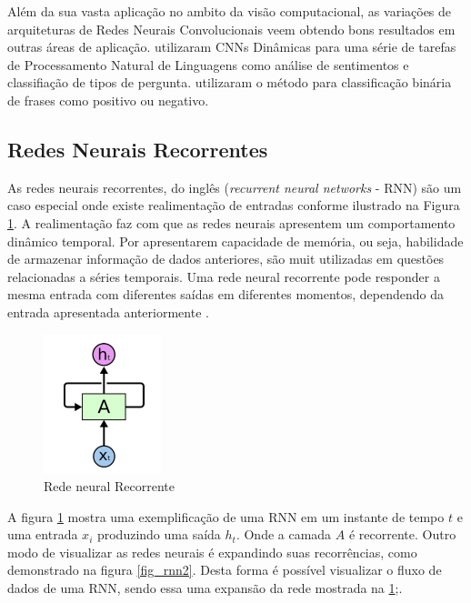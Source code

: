 Além da sua vasta aplicação no ambito da visão computacional, as variações de arquiteturas de Redes Neurais Convolucionais veem obtendo bons resultados em outras áreas de aplicação.\cite{rnc4} utilizaram CNNs Dinâmicas para uma série de tarefas de Processamento Natural de Linguagens como análise de sentimentos e classifiação de tipos de pergunta.\cite{rnc5} utilizaram o método para classificação binária de frases como positivo ou negativo.\cite{rnc3}

\subsection{Redes Neurais Recorrentes}

As redes neurais recorrentes, do inglês (\emph{recurrent neural networks} - RNN) são um caso especial onde existe realimentação de entradas\cite{rnn2} conforme ilustrado na Figura \ref{fig_rnn}. A realimentação faz com que as redes neurais apresentem um comportamento dinâmico temporal. Por apresentarem capacidade de memória, ou seja, habilidade de armazenar informação de dados anteriores, são muit utilizadas em questões relacionadas a séries temporais. Uma rede neural recorrente pode responder a mesma entrada com diferentes saídas em diferentes momentos, dependendo da entrada apresentada anteriormente \cite{rnn}.

\begin{figure}[!h]
	\centering
	\label{fig_rnn}
		\includegraphics[keepaspectratio=true,scale=0.4]{figuras/exempo_rede_neural_recorrente.png}
	\caption{Rede neural Recorrente \cite{rnn3}}
\end{figure}

A figura \ref{fig_rnn} mostra uma exemplificação de uma RNN em um instante de tempo {$t$} e uma entrada {$x_i$} produzindo uma saída {$h_t$}. Onde a camada {$A$} é recorrente. Outro modo de visualizar as redes neurais é expandindo suas recorrências, como demonstrado na figura \ref{fig_rnn2}. Desta forma é possível visualizar o fluxo de dados de uma RNN, sendo essa uma expansão da rede mostrada na \ref{fig_rnn};.

